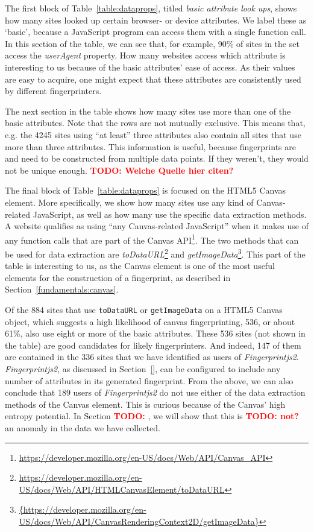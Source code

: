 \documentclass[
    fontsize=12pt,
    headings=small,
    parskip=half,
    bibliography=totoc,
    numbers=noenddot,
    open=any
    ]{scrreprt}
\newcommand{\todo}[1]{\textcolor{red}{\textbf{TODO: #1}}}
\begin{document}
The first block of Table~\ref{table:dataprops}, titled \textit{basic attribute look ups},
shows how many sites looked up certain browser- or device attributes.
We label these as `basic', because a JavaScript program can access them with a single function
call. In this section of the table, we can see that, for example, 90\% of sites in the set access the
\textit{userAgent} property.
How many websites access which attribute is interesting to us because of the basic attributes' ease of access.
As their values are easy to acquire, one might expect that these attributes are consistently used by different fingerprinters.

The next section in the table shows how many sites use more than one of the basic attributes.
Note that the rows are not mutually exclusive. This means that, e.g. the 4245 sites using ``at least'' three
attributes also contain all sites that use more than three attributes.
This information is useful, because fingerprints are and need to be constructed from
multiple data points. If they weren't, they would not be unique enough.
\todo{Welche Quelle hier citen?}

The final block of Table~\ref{table:dataprops} is focused on the HTML5 Canvas element.
More specifically, we show how many sites use any kind of Canvas-related JavaScript,
as well as how many use the specific data extraction methods.
A website qualifies as using ``any Canvas-related JavaScript'' when it makes use
of any function calls that are part of the Canvas API\footnote{\url{https://developer.mozilla.org/en-US/docs/Web/API/Canvas_API}}.
The two methods that can be used for data extraction are
\textit{toDataURL}\footnote{\url{https://developer.mozilla.org/en-US/docs/Web/API/HTMLCanvasElement/toDataURL}}
and
\textit{getImageData}\footnote{\url{{https://developer.mozilla.org/en-US/docs/Web/API/CanvasRenderingContext2D/getImageData}}}.
This part of the table is interesting to us, as the Canvas element is one of the
most useful elements for the construction of a fingerprint, as described
in Section~\ref{fundamentals:canvas}.

Of the 884 sites that use \texttt{toDataURL} or \texttt{getImageData} on a HTML5 Canvas object, which suggests
a high likelihood of canvas fingerprinting, 536, or about 61\%, also use eight or more of the basic attributes.
These 536 sites (not shown in the table) are good candidates for likely fingerprinters.
And indeed, 147 of them are contained in the 336 sites that we have identified as users of \textit{Fingerprintjs2}.
\textit{Fingerprintjs2}, as discussed in Section~\ref{}, can be configured to include any number of attributes
in its generated fingerprint. From the above, we can also conclude that 189 users of \textit{Fingerprintjs2}
do not use either of the data extraction methods of the Canvas element. This is curious because
of the Canvas' high entropy potential.
In Section \todo{}, we will show that this is \todo{not?} an anomaly in the data we have collected.
\end{document}
